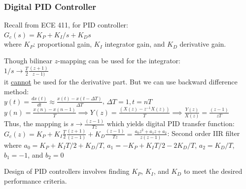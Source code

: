 \documentclass[mathserif, 10pt]{beamer} %
\begin{document}
\frame
{

\small
\frametitle{Digital PID Controller}

Recall from ECE 411, for PID controller: \\  \vspace{.05in}
$G_c(s) = K_P+K_I/s +K_Ds$\\  \vspace{.05in}
where $K_P$: proportional gain, $K_I$ integrator gain, and $K_D$ derivative gain. \\ \vspace{.05in}

Though bilinear $z$-mapping can be used for the integrator:\\ \vspace{.05in}
$1/s \to \frac{T}{2}\frac{(z+1)}{z-1)}$\\ \vspace{.05in}
it \underline{cannot} be used for the derivative part. But we can use backward difference method: \\ \vspace{.05in}
$y(t) = \frac{dx(t)}{dt} \approx \frac{x(t)-x(t-\Delta T)}{\Delta T}$, $\Delta T=1, t = nT$\\ \vspace{.05in}
$y(n) = \frac{x(n)-x(n-1)}{T} \implies Y(z) = \frac{(X(z)-z^{-1}X(z))}{T} \implies \frac{Y(z)}{X(z)} = \frac{(z-1)}{zT}$\\ \vspace{.05in}
Thus, the mapping is $s \to \frac{(z-1)}{Tz}$ which yields digital PID transfer function: \\ \vspace{.05in}
$G_c(z) = K_P +K_I \frac{T}{2} \frac{(z+1)}{(z-1)}+ K_D \frac{(z-1)}{Tz} =\frac{a_0z^2+a_1z+a_2}{z(z-1)}$:  Second order IIR filter \\ \vspace{.05in}
where  $a_0 = K_P +K_IT/2+K_D/T$,  $a_1 = -K_P+K_IT/2-2K_D/T$, $a_2 = K_D/T$, $b_1=-1$, and $b_2=0$ \\ \vspace{.05in}

Design of PID controllers involves finding $K_P$, $K_I$, and $K_D$ to meet the desired performance criteria.
}
\end{document}
